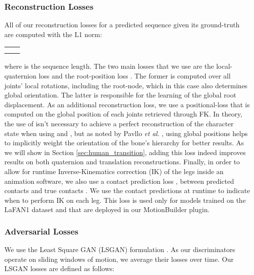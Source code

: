 \documentclass[acmtog]{acmart}
\newcommand{\etal}{\textit{et al}. }
\begin{document}
\subsubsection{Reconstruction Losses}
All of our reconstruction losses for a predicted sequence  given its ground-truth  are computed with the L1 norm:
\begin{table}[H]
     \begin{adjustbox}{width=\columnwidth,center}
         \begin{tabular}{c c}
                 \vbox{}
                 & \vbox{} \\
                
                 \vbox{}
                 & \vbox{}
         \end{tabular}
     \end{adjustbox}
     \vskip -0.25cm
 \end{table}
where  is the sequence length. The two main losses that we use are the local-quaternion loss  and the root-position loss . The former is computed over all joints' local rotations, including the root-node, which in this case also determines global orientation. The latter is responsible for the learning of the global root displacement. As an additional reconstruction loss, we use a positional-loss  that is computed on the global position of each joints retrieved through FK. In theory, the use of  isn't necessary to achieve a perfect reconstruction of the character state when using  and , but as noted by Pavllo \etal {}, using global positions helps to implicitly weight the orientation of the bone's hierarchy for better results. As we will show in Section \ref{sec:human_transition}, adding this loss indeed improves results on both quaternion and translation reconstructions. Finally, in order to allow for runtime Inverse-Kinematics correction (IK) of the legs inside an animation software, we also use a contact prediction loss , between predicted contacts  and true contacts . We use the contact predictions at runtime to indicate when to perform IK on each leg. This loss is used only for models trained on the LaFAN1 dataset and that are deployed in our MotionBuilder plugin. 


\subsubsection{Adversarial Losses}
We use the Least Square GAN (LSGAN) formulation \cite{mao2017least}. As our discriminators operate on sliding windows of motion, we average their losses over time. Our LSGAN losses are defined as follows:
\end{document}
